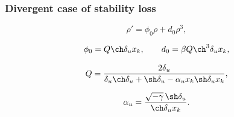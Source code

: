 \documentclass[fullscreen=true, unicode, bookmarks=false]{beamer}
\begin{document}
\begin{frame}
\frametitle{ Divergent case of stability loss }

\begin{equation}
	\rho' = \phi_0 \rho + d_0 \rho^3,
\end{equation}

\bigskip

$$ \phi_0 = Q \ch \delta_u x_k, \qquad d_0 = \beta Q \ch^3 \delta_u x_k, $$

\bigskip

$$ Q = \frac{2 \delta_u}{\delta_u\ch \delta_u + \sh \delta_u - \alpha_u x_k \sh \delta_u x_k}, $$

$$ \alpha_u = \frac{ \sqrt{-\gamma} \, \sh \delta_u }{ \ch\delta_u x_k }. $$

\end{frame}
\end{document}
